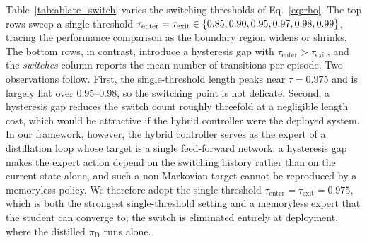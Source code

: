 \documentclass[journal, twoside]{IEEEtran}
\begin{document}
Table~\ref{tab:ablate_switch} varies the switching thresholds of Eq.~\eqref{eq:rho}. The top rows sweep a single threshold $\tau_{\mathrm{enter}}=\tau_{\mathrm{exit}}\in\{0.85,0.90,0.95,\\0.97,0.98,0.99\}$, tracing the performance comparison as the boundary region widens or shrinks. The bottom rows, in contrast, introduce a hysteresis gap with $\tau_{\mathrm{enter}}>\tau_{\mathrm{exit}}$, and the \emph{switches} column reports the mean number of transitions per episode. Two observations follow. First, the single-threshold length peaks near $\tau=0.975$ and is largely flat over $0.95$--$0.98$, so the switching point is not delicate. Second, a hysteresis gap reduces the switch count roughly threefold at a negligible length cost, which would be attractive if the hybrid controller were the deployed system. In our framework, however, the hybrid controller serves as the expert of a distillation loop whose target is a single feed-forward network: a hysteresis gap makes the expert action depend on the switching history rather than on the current state alone, and such a non-Markovian target cannot be reproduced by a memoryless policy. We therefore adopt the single threshold $\tau_{\mathrm{enter}}=\tau_{\mathrm{exit}}=0.975$, which is both the strongest single-threshold setting and a memoryless expert that the student can converge to; the switch is eliminated entirely at deployment, where the distilled $\pi_{\mathrm{D}}$ runs alone.
\end{document}
